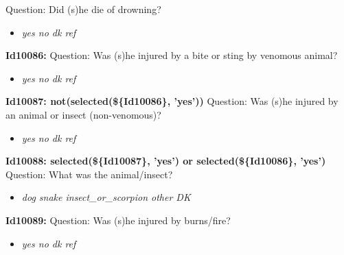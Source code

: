 \documentclass{article}%
\begin{document}
Question: Did (s)he die of drowning?\newline%
%
\begin{itemize}%
\item%
\textit{yes\newline%
 no\newline%
 dk\newline%
 ref\newline%
}%
\end{itemize}%
\textbf{Id10086: \newline%
}%
Question: Was (s)he injured by a bite or sting by venomous animal?\newline%
%
\begin{itemize}%
\item%
\textit{yes\newline%
 no\newline%
 dk\newline%
 ref\newline%
}%
\end{itemize}%
\textbf{Id10087: not(selected(\$\{Id10086\}, 'yes'))\newline%
}%
Question: Was (s)he injured by an animal or insect (non{-}venomous)?\newline%
%
\begin{itemize}%
\item%
\textit{yes\newline%
 no\newline%
 dk\newline%
 ref\newline%
}%
\end{itemize}%
\textbf{Id10088: selected(\$\{Id10087\}, 'yes') or selected(\$\{Id10086\}, 'yes')\newline%
}%
Question: What was the animal/insect?\newline%
%
\begin{itemize}%
\item%
\textit{dog\newline%
 snake\newline%
 insect\_or\_scorpion\newline%
 other\newline%
 DK\newline%
}%
\end{itemize}%
\textbf{Id10089: \newline%
}%
Question: Was (s)he injured by burns/fire?\newline%
%
\begin{itemize}%
\item%
\textit{yes\newline%
 no\newline%
 dk\newline%
 ref\newline%
}%
\end{itemize}%
\end{document}
